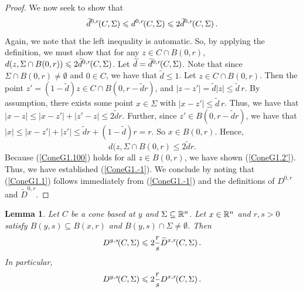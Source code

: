 \documentclass[11pt]{article}
\newtheorem{lemma}[theorem]{Lemma}
\theoremstyle{definition}
\numberwithin{equation}{section}
\newcommand{\D}[3]{D^{#1}\hspace{-3 pt}\left(#2,#3\right)}
\newcommand{\Da}[3]{\twid{D}^{#1}\hspace{-3 pt}\left(#2,#3\right)}
\newcommand{\hd}[3]{d^{#1}\hspace{-3 pt}\left(#2,#3\right)}
\newcommand{\hda}[3]{\twid{d}^{#1}\hspace{-3 pt}\left(#2,#3\right)}
\newcommand{\sleq}{\leqslant}
\newcommand{\twid}[1]{\widetilde{#1}}
\begin{document}
\begin{proof}
We now seek to show that
\begin{equation}\label{ConeG1.2'}
\hda{0,r}C\Sigma\sleq \hd{0,r}C\Sigma \sleq 2 \hda{0,r}C\Sigma .\end{equation}
Again, we note that the left inequality is automatic. So, by applying the definition, we must show that for any $z\in C\cap B(0,r)$, $d(z,\Sigma\cap B(0,r)) \sleq 2 \hda{0,r}C\Sigma$. Let $\twid d = \hda{0,r}C\Sigma$. Note that since $\Sigma\cap B(0,r)\neq\emptyset$ and $0\in C$, we have that $\twid d\sleq 1$. Let $z\in C\cap B(0,r)$. Then the point $z' = (1-\twid d)z\in C\cap B(0,r-\twid dr)$, and $|z-z'| = \twid d|z|\leq\twid  d\,r$. By assumption, there exists some point $x\in \Sigma$ with $|x-z'|\sleq \twid d\,r$. Thus, we have that
$|x-z|\sleq |x-z'|+|z'-z| \sleq 2\twid dr.$
Further, since $z'\in B(0,r-\twid dr)$, we have that
$|x|\sleq |x-z'| + |z'|\sleq \twid dr + (1-\twid d)r = r.$
So $x\in B(0,r)$. Hence,
\begin{equation}\label{ConeG1.100}
d(z,\Sigma\cap B(0,r)\sleq 2 \twid dr.
\end{equation}
Because (\ref{ConeG1.100}) holds for all $z\in B(0,r)$, we have shown (\ref{ConeG1.2'}). Thus, we have established (\ref{ConeG1.-1}). We conclude by noting that (\ref{ConeG1.1}) follows immediately from (\ref{ConeG1.-1}) and the definitions of $D^{0,r}$ and $\twid D^{0,r}$.

\end{proof}


\begin{lemma}\label{ConeG2}
Let $C$ be a cone based at $y$ and $\Sigma\subseteq\mathbb{R}^{n}$. Let $x\in \mathbb{R}^{n}$ and $r,s>0$ satisfy $B(y,s)\subseteq B(x,r)$ and $B(y,s)\cap \Sigma\neq \emptyset$. Then
\begin{equation}\label{ConeG2.1}
\D{y,s}C\Sigma\sleq 2 \frac rs \Da{x,r}C\Sigma.
\end{equation}
In particular,
\begin{equation}\label{ConeG2.2}
\D{y,s}C\Sigma\sleq 2 \frac rs \D{x,r}C\Sigma.
\end{equation}
\end{lemma}
\end{document}
